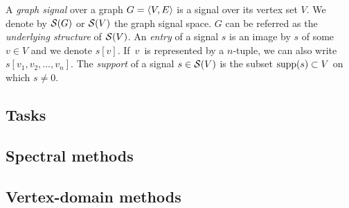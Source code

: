 A \emph{graph signal} over a graph $G = \langle V, E \rangle$ is a signal over its vertex set $V$. We denote by $\mathcal{S}(G)$ or $\mathcal{S}(V)$ the graph signal space. $G$ can be referred as the \emph{underlying structure} of $\mathcal{S}(V)$.
An \emph{entry} of a signal $s$ is an image by $s$ of some $v \in V$ and we denote $s[v]$. If~$v$~is represented by a $n$-tuple, we can also write $s[v_1, v_2, \ldots, v_n]$.
The \emph{support} of a signal $s \in \mathcal{S}(V)$ is the subset $\operatorname{supp}(s) \subset V$ on which $s \neq 0$.

\subsection{Tasks}

\subsection{Spectral methods}

\subsection{Vertex-domain methods}





